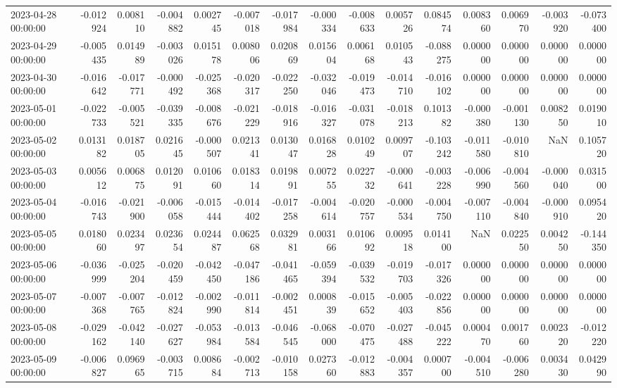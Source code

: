 \begin{tabular}{lrrrrrrrrrrrrrr}
2023-04-28 00:00:00 & -0.012924 & 0.008110 & -0.004882 & 0.002745 & -0.007018 & -0.017984 & -0.000334 & -0.008633 & 0.005726 & 0.084574 & 0.008360 & 0.006970 & -0.003920 & -0.073400 \\
2023-04-29 00:00:00 & -0.005435 & 0.014989 & -0.003026 & 0.015178 & 0.008006 & 0.020869 & 0.015604 & 0.006168 & 0.010543 & -0.088275 & 0.000000 & 0.000000 & 0.000000 & 0.000000 \\
2023-04-30 00:00:00 & -0.016642 & -0.017771 & -0.000492 & -0.025368 & -0.020317 & -0.022250 & -0.032046 & -0.019473 & -0.014710 & -0.016102 & 0.000000 & 0.000000 & 0.000000 & 0.000000 \\
2023-05-01 00:00:00 & -0.022733 & -0.005521 & -0.039335 & -0.008676 & -0.021229 & -0.018916 & -0.016327 & -0.031078 & -0.018213 & 0.101382 & -0.000380 & -0.001130 & 0.008250 & 0.019010 \\
2023-05-02 00:00:00 & 0.013182 & 0.018705 & 0.021645 & -0.000507 & 0.021341 & 0.013047 & 0.016828 & 0.010249 & 0.009707 & -0.103242 & -0.011580 & -0.010810 & NaN & 0.105720 \\
2023-05-03 00:00:00 & 0.005612 & 0.006875 & 0.012091 & 0.010660 & 0.018314 & 0.019891 & 0.007255 & 0.022732 & -0.000641 & -0.003228 & -0.006990 & -0.004560 & -0.000040 & 0.031500 \\
2023-05-04 00:00:00 & -0.016743 & -0.021900 & -0.006058 & -0.015444 & -0.014402 & -0.017258 & -0.004614 & -0.020757 & -0.000534 & -0.004750 & -0.007110 & -0.004840 & -0.000910 & 0.095420 \\
2023-05-05 00:00:00 & 0.018060 & 0.023497 & 0.023654 & 0.024487 & 0.062568 & 0.032981 & 0.003166 & 0.010692 & 0.009518 & 0.014100 & NaN & 0.022550 & 0.004250 & -0.144350 \\
2023-05-06 00:00:00 & -0.036999 & -0.025204 & -0.020459 & -0.042450 & -0.047186 & -0.041465 & -0.059394 & -0.039532 & -0.019703 & -0.017326 & 0.000000 & 0.000000 & 0.000000 & 0.000000 \\
2023-05-07 00:00:00 & -0.007368 & -0.007765 & -0.012824 & -0.002990 & -0.011814 & -0.002451 & 0.000839 & -0.015652 & -0.005403 & -0.022856 & 0.000000 & 0.000000 & 0.000000 & 0.000000 \\
2023-05-08 00:00:00 & -0.029162 & -0.042140 & -0.027627 & -0.053984 & -0.013584 & -0.046545 & -0.068000 & -0.070475 & -0.027488 & -0.045222 & 0.000470 & 0.001760 & 0.002320 & -0.012220 \\
2023-05-09 00:00:00 & -0.006827 & 0.096965 & -0.003715 & 0.008684 & -0.002713 & -0.010158 & 0.027360 & -0.012883 & -0.004357 & 0.000700 & -0.004510 & -0.006280 & 0.003430 & 0.042990 \\

\end{tabular}
